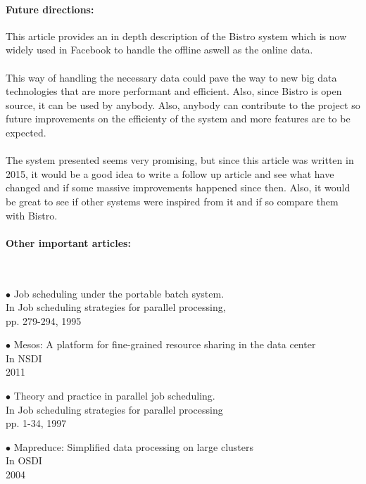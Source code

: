 \documentclass[11pt]{article}
\begin{document}
\paragraph{Future directions:}
This article provides an in depth description of the Bistro system which is now widely used in Facebook to handle the offline aswell as the online data. 
\\
\\
This way of handling the necessary data could pave the way to new big data technologies that are more performant and efficient. Also, since Bistro is open source, it can be used by anybody. Also, anybody can contribute to the project so future improvements on the efficienty of the system and more features are to be expected.
\\
\\
The system presented seems very promising, but since this article was written in 2015, it would be a good idea to write a follow up article and see what have changed and if some massive improvements happened since then. Also, it would be great to see if other systems were inspired from it and if so compare them with Bistro.

\paragraph{Other important articles:}
~\newline
~\newline
\begin{minipage}[t]{1\textwidth}
    \begin{description}
        \item $\bullet$ Job scheduling under the portable
        batch system. \\ In Job scheduling strategies for parallel processing,
        \\ pp. 279-294, 1995 
        \item $\bullet$ Mesos: A platform for fine-grained resource sharing
        in the data center \\  In NSDI
        \\ 2011
        \item $\bullet$ Theory and practice in
        parallel job scheduling.  \\  In Job scheduling strategies
        for parallel processing
        \\  pp. 1-34, 1997
        \item $\bullet$ Mapreduce: Simplified
        data processing on large clusters \\ In OSDI \\
        2004
    \end{description}
\end{minipage}
\end{document}

